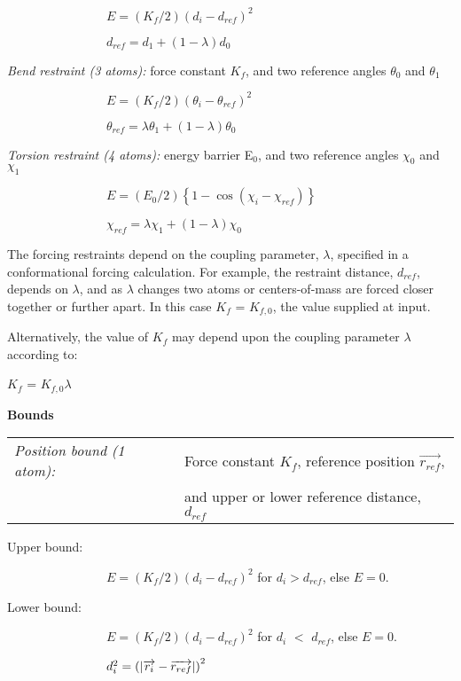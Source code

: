$\qquad \qquad \qquad \qquad E=\left( K_{f}/2\right) \left(
d_{i}-d_{ref}\right) ^{2}$

$\qquad \qquad \qquad \qquad d_{ref}=d_{1}+\left( 1-\lambda \right) d_{0}$

{\em Bend restraint (3 atoms):} force constant $K_{f}$, and two reference
angles $\theta _{0}$ and $\theta _{1}$

$\qquad \qquad \qquad \qquad E=\left( K_{f}/2\right) \left( \theta
_{i}-\theta _{ref}\right) ^{2}$

$\qquad \qquad \qquad \qquad \theta _{ref}=\lambda \theta _{1}+\left(
1-\lambda \right) \theta _{0}$

{\em Torsion restraint (4 atoms):} energy barrier E$_{0}$, and two reference
angles $\chi _{0}$ and $\chi _{1}$

$\qquad \qquad \qquad \qquad E=\left( E_{0}/2\right) \left\{ 1-\cos \left(
\chi _{i}-\chi _{ref}\right) \right\} $

$\qquad \qquad \qquad \qquad \chi _{ref}=\lambda \chi _{1}+\left( 1-\lambda
\right) \chi _{0}$

The forcing restraints depend on the coupling parameter, $\lambda $,
specified in a conformational forcing calculation. For example, the
restraint distance, $d_{ref}$, depends on $\lambda $, and as $\lambda $
changes two atoms or centers-of-mass are forced closer together or further
apart. In this case $K_{f}$ = $K_{f,0}$, the value supplied at input.

Alternatively, the value of $K_{f}$ may depend upon the coupling parameter
$\lambda$ according to:

$K_{f}$ = $K_{f,0} \lambda$

{\bf Bounds}

\begin{tabular}{ll}
{\em Position bound (1 atom):} & Force constant $K_{f}$, reference position $
\overrightarrow{r_{ref}}$, \\ 
& and upper or lower reference distance, $d_{ref}$
\end{tabular}

\qquad Upper bound:

$\qquad \qquad \qquad \qquad E=\left( K_{f}/2\right) \left(
d_{i}-d_{ref}\right) ^{2}$ for $d_{i}>d_{ref}$, else $E=0$.

\qquad Lower bound:

$\qquad \qquad \qquad \qquad E=\left( K_{f}/2\right) \left(
d_{i}-d_{ref}\right) ^{2}$ for $d_{i}$ $<$ $d_{ref}$, else $E=0$.\smallskip

$\qquad \qquad \qquad \qquad d_{i}^{2}=\left( \left| \overrightarrow{r_{i}}-
\overrightarrow{r_{ref}}\right| \right) ^{2}\medskip \medskip $

